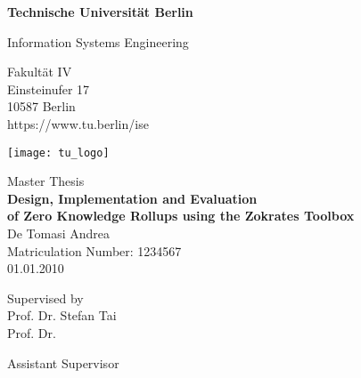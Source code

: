 \thispagestyle{empty}
\begin{center}

\vspace*{1.4cm}
{\LARGE \textbf{Technische Universität Berlin}}

\vspace{0.5cm}

{\large Information Systems Engineering\\[1mm]}

Fakultät IV\\
Einsteinufer 17\\
10587 Berlin\\
https://www.tu.berlin/ise\\

\vspace*{1cm}

\texttt{[image: tu\_logo]}

\vspace*{1.0cm}

{\LARGE Master Thesis}\\

\vspace{1.0cm}
{\LARGE \textbf{Design, Implementation and Evaluation}}\\
\vspace*{0.3cm}
{\LARGE \textbf{of Zero Knowledge Rollups using the Zokrates Toolbox}}\\
\vspace*{1.0cm}
{\LARGE De Tomasi Andrea}
\\
\vspace*{0.5cm}
Matriculation Number: 1234567\\
01.01.2010\\ %
\vspace*{1.0cm}

Supervised by\\
Prof. Dr. Stefan Tai\\
Prof. Dr. 

\vspace*{0.5cm}
Assistant Supervisor\\
\vspace{3cm}


\end{center}


